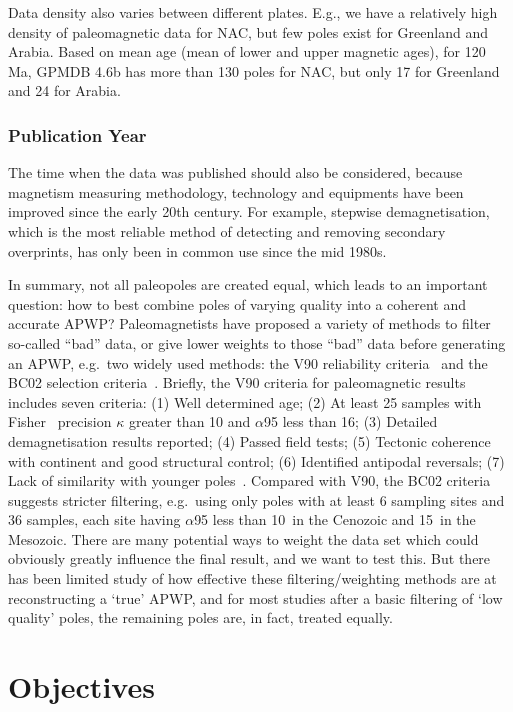 Data density also varies between different plates. E.g., we have a relatively
high density of paleomagnetic data for NAC, but few poles exist for Greenland
and Arabia. Based on mean age (mean of lower and upper magnetic ages), for
120 Ma, GPMDB 4.6b has more than 130 poles for NAC, but only 17 for
Greenland and 24 for Arabia.

\subsubsection{Publication Year}

The time when the data was published should also be considered, because
magnetism measuring methodology, technology and equipments have been improved
since the early 20th century. For example, stepwise demagnetisation, which is
the most reliable method of detecting and removing secondary overprints, has
only been in common use since the mid 1980s.

In summary, not all paleopoles are created equal, which leads to an
important question: how to best combine poles of varying quality into a
coherent and accurate APWP\@? Paleomagnetists have proposed a variety of methods
to filter so-called ``bad'' data, or give lower weights to those ``bad'' data
before generating an APWP, e.g.\ two widely used methods: the V90 reliability
criteria~\citep{v90} and the BC02 selection criteria~\citep{B02}. Briefly, the V90
criteria for paleomagnetic results includes seven criteria: (1) Well determined
age; (2) At least 25 samples with Fisher~\citep{F53} precision $\kappa$ greater
than 10 and $\alpha$95 less than 16\degree; (3) Detailed demagnetisation results
reported; (4) Passed field tests; (5) Tectonic coherence with continent and good
structural control; (6) Identified antipodal reversals; (7) Lack of similarity
with younger poles~\citep{T92}. Compared with V90, the BC02 criteria suggests
stricter filtering, e.g.\ using only poles with at least 6 sampling sites and 36
samples, each site having $\alpha$95 less than 10\degree\ in the Cenozoic and
15\degree\ in the Mesozoic. There are many potential ways to weight the data set
which could obviously greatly influence the final result, and we want to test
this. But there has been limited study of how effective these
filtering/weighting methods are at reconstructing a `true' APWP, and for most
studies after a basic filtering of `low quality' poles, the remaining poles are,
in fact, treated equally.

\section{Objectives}

